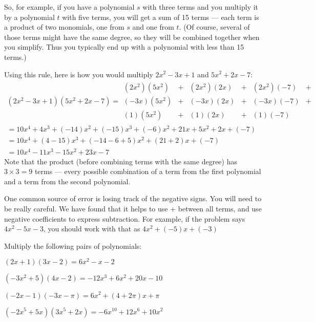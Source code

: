 So, for example, if you have a polynomial $s$ with three terms and you
multiply it by a polynomial $t$ with five terms, you will get a sum of
15 terms --- each term is a product of two monomials, one from $s$ and
one from $t$.  (Of course, several of those terms might have the same
degree, so they will be combined together when you simplify. Thus you
typically end up with a polynomial with less than 15 terms.)

Using this rule, here is how you would multiply $2x^2 - 3x + 1$ and
$5x^2 + 2x - 7$:
\begin{multline*}
  (2x^2 - 3x + 1)(5x^2 + 2x - 7)  = \begin{matrix}
  (2x^2)(5x^2)& + &(2x^2)(2x)& + &(2x^2)(-7)& + \\
  (-3x)(5x^2)& + &(-3x)(2x)& + &(-3x)(-7)& + \\
    (1)(5x^2)& + &(1)(2x)& + &(1)(-7)& 
  \end{matrix} \\
  = 10x^4 + 4x^3 + (-14)x^2 + (-15)x^3 + (-6)x^2 + 21x +5x^2 + 2x + (-7) \\
  = 10x^4 + (4 - 15)x^3 + (-14 - 6 + 5)x^2  + (21 + 2)x + (-7) \\
  = 10x^4 - 11x^3 - 15x^2 + 23x - 7
\end{multline*}
Note that the product (before combining terms with the same degree) has
$3 \times 3 = 9$ terms --- every possible combination of a term from the
first polynomial and a term from the second polynomial.

One common source of error is losing track of the negative
signs. You will need to be really careful. We have found that it
helps to use + between all terms, and use negative coefficients to
express subtraction. For example, if the problem says $4x^2 - 5x - 3$,
you should work with that as $4x^2 + (-5)x + (-3)$

\begin{Exercise}[title={Multiplying polynomials}, label=multpolys]
  Multiply the following pairs of polynomials:
  \vspace{15mm}
  \vspace{15mm}
  \vspace{15mm}
  \vspace{15mm}

\end{Exercise}
\begin{Answer}[ref=multpolys]
  $(2x + 1)(3x - 2) = 6x^2 - x - 2$

  $(-3x^2 + 5)(4x - 2) = -12x^3 + 6x^2 + 20x - 10$

  $(-2x - 1)(-3x - \pi) = 6x^2 + (4 + 2\pi)x + \pi$ 

  $(-2x^5 + 5x)(3x^5 + 2x) = -6x^{10} + 12x^6 + 10x^2$
\end{Answer}


